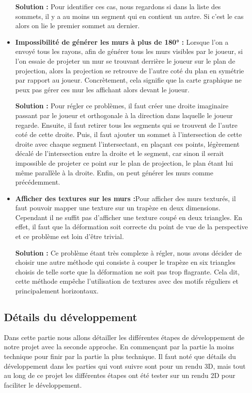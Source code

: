 \documentclass[11pt]{article}
\begin{document}
\begin{itemize}
	\textbf{Solution : }Pour identifier ces cas, nous regardons si dans la liste des sommets, il y a au moins
	un segment qui en contient un autre. Si c'est le cas alors on lie le premier sommet au dernier.

	\item \textbf{Impossibilité de générer les murs à plus de 180° :} Lorsque l'on a envoyé tous les rayons,
	afin de générer tous les murs visibles par le joueur, si l'on essaie de projeter un mur se trouvant derrière
	le joueur sur le plan de projection, alors la projection se retrouve de l'autre coté du plan en symétrie 
	par rapport au joueur. Concrètement, cela signifie que la carte graphique ne peux pas gérer ces mur les
	affichant alors devant le joueur.

	\textbf{Solution : }Pour régler ce problèmes, il faut créer une droite imaginaire passant par le 
	joueur et orthogonale à la direction dans laquelle le joueur regarde. Ensuite, il faut retirer
	tous les segments qui se trouvent de l'autre coté de cette droite. Puis, il faut ajouter un sommet
	à l'intersection de cette droite avec chaque segment l'intersectant, en plaçant ces points, 
	légèrement décalé de l'intersection entre la droite et le segment, car sinon il serait impossible de
	projeter ce point sur le plan de projection, le plan étant lui même parallèle à la droite. Enfin, 
	on peut générer les murs comme précédemment.

	\item \textbf{Afficher des textures sur les murs :}Pour afficher des murs texturés, il faut
	pouvoir mapper une texture sur un trapèze en deux dimensions. Cependant il ne suffit pas d'afficher 
	une texture coupé en deux triangles. En effet, il faut que la déformation soit correcte
	du point de vue de la perspective et ce problème est loin d'être trivial.

	\textbf{Solution : }Ce problème étant très complexe à régler, nous avons décider de choisir
	une autre méthode qui consiste à couper le trapèze en six triangles choisis de telle 
	sorte que la déformation ne soit pas trop flagrante. Cela dit, cette méthode empêche 
	l'utilisation de textures avec des motifs réguliers et principalement horizontaux.
\end{itemize}



\subsection{Détails du développement}
Dans cette partie nous allons détailler les différentes étapes de développement de notre 
projet avec la seconde approche. En commençant par la partie la moins technique pour 
finir par la partie la plus technique. Il faut noté que détails du développement dans les 
parties qui vont suivre sont pour un rendu 3D, mais tout au long de ce projet les 
différentes étapes ont été tester sur un rendu 2D pour faciliter le développement.
\end{document}
